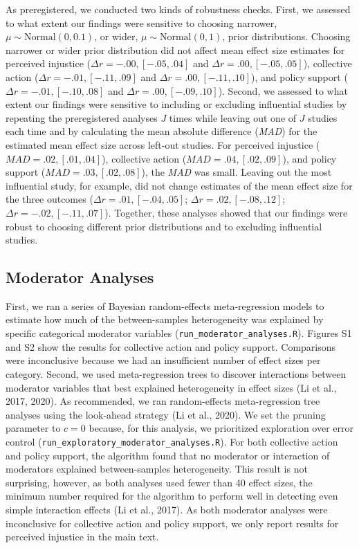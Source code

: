 \documentclass[12pt, letterpaper]{article}
\begin{document}
As preregistered, we conducted two kinds of robustness checks. First, we
assessed to what extent our findings were sensitive to choosing
narrower, \(\mu \sim \text{Normal}(0, 0.1)\), or wider,
\(\mu \sim \text{Normal}(0, 1)\), prior distributions. Choosing narrower
or wider prior distribution did not affect mean effect size estimates
for perceived injustice (\(\Delta r = -.00, [-.05, .04]\) and
\(\Delta r = .00, [-.05, .05]\)), collective action
(\(\Delta r = -.01, [-.11, .09]\) and \(\Delta r = .00, [-.11, .10]\)),
and policy support (\(\Delta r = -.01, [-.10, .08]\) and
\(\Delta r = .00, [-.09, .10]\)). Second, we assessed to what extent our
findings were sensitive to including or excluding influential studies by
repeating the preregistered analyses \(J\) times while leaving out one
of \(J\) studies each time and by calculating the mean absolute
difference (\emph{MAD}) for the estimated mean effect size across
left-out studies. For perceived injustice
(\(\textit{MAD} = .02, [.01, .04]\)), collective action
(\(\textit{MAD} = .04, [.02, .09]\)), and policy support
(\(\textit{MAD} = .03, [.02, .08]\)), the \emph{MAD} was small. Leaving
out the most influential study, for example, did not change estimates of
the mean effect size for the three outcomes
(\(\Delta r = .01, [-.04, .05]\); \(\Delta r = .02, [-.08, .12]\);
\(\Delta r = -.02, [-.11, .07]\)). Together, these analyses showed that
our findings were robust to choosing different prior distributions and
to excluding influential studies.

\hypertarget{moderator-analyses}{%
\subsection{Moderator Analyses}\label{moderator-analyses}}

First, we ran a series of Bayesian random-effects meta-regression models
to estimate how much of the between-samples heterogeneity was explained
by specific categorical moderator variables
(\texttt{run\_moderator\_analyses.R}). Figures S1 and S2 show the
results for collective action and policy support. Comparisons were
inconclusive because we had an insufficient number of effect sizes per
category. Second, we used meta-regression trees to discover interactions
between moderator variables that best explained heterogeneity in effect
sizes (Li et al., 2017, 2020). As recommended, we ran random-effects
meta-regression tree analyses using the look-ahead strategy (Li et al.,
2020). We set the pruning parameter to \(c = 0\) because, for this
analysis, we prioritized exploration over error control
(\texttt{run\_exploratory\_moderator\_analyses.R}). For both collective
action and policy support, the algorithm found that no moderator or
interaction of moderators explained between-samples heterogeneity. This
result is not surprising, however, as both analyses used fewer than 40
effect sizes, the minimum number required for the algorithm to perform
well in detecting even simple interaction effects (Li et al., 2017). As
both moderator analyses were inconclusive for collective action and
policy support, we only report results for perceived injustice in the
main text.
\end{document}
